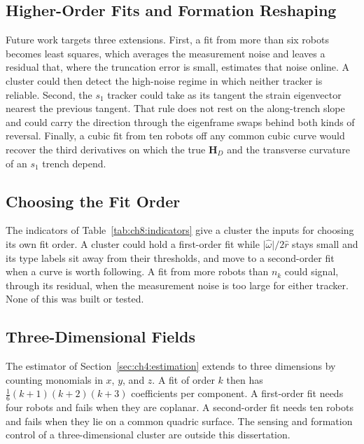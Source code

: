 \subsection{Higher-Order Fits and Formation Reshaping}
\label{sec:ch9:higher_order}

Future work targets three extensions. First, a fit from more than six
robots becomes least squares, which averages the measurement noise and
leaves a residual that, where the truncation error is small, estimates
that noise online. A cluster could then detect the high-noise regime in
which neither tracker is reliable. Second, the
$s_1$ tracker could take as its tangent the strain eigenvector nearest the
previous tangent. That rule does not rest on the along-trench slope and
could carry the direction through the eigenframe swaps behind both kinds
of reversal. Finally, a cubic
fit from ten robots off any common cubic curve would recover the third
derivatives on which the true $\mathbf{H}_D$ and the transverse curvature
of an $s_1$ trench depend.

\subsection{Choosing the Fit Order}
\label{sec:ch9:switching}

The indicators of Table~\ref{tab:ch8:indicators} give a cluster the inputs
for choosing its own fit order. A cluster could hold a first-order fit while
$\lvert\hat{\omega}\rvert/2\hat{r}$ stays small and its type labels sit away
from their thresholds, and move to a second-order fit when a curve is worth
following. A fit from more robots than $n_k$ could signal, through its
residual, when the measurement noise is too large for either tracker. None
of this was built or tested.

\subsection{Three-Dimensional Fields}
\label{sec:ch9:3d}

The estimator of Section~\ref{sec:ch4:estimation} extends to three
dimensions by counting monomials in $x$, $y$, and $z$. A fit of order $k$
then has $\tfrac{1}{6}(k+1)(k+2)(k+3)$ coefficients per component. A
first-order fit needs four robots and fails when they are coplanar. A
second-order fit needs ten robots and fails when they lie on a common
quadric surface. The sensing and formation control of a
three-dimensional cluster are outside this dissertation.

